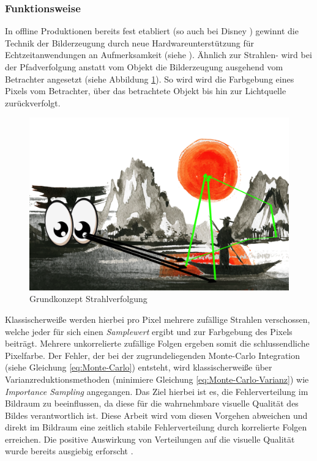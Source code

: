 \subsubsection{Funktionsweise}

In offline Produktionen bereits fest etabliert (so auch bei Disney \cite{DisneyPathTracing}) gewinnt die Technik
der Bilderzeugung durch neue Hardwareunterstützung für Echtzeitanwendungen an Aufmerksamkeit
(siehe \cite{Sch19}).
Ähnlich zur Strahlen- wird bei der Pfadverfolgung anstatt vom Objekt die Bilderzeugung ausgehend 
vom Betrachter angesetzt (siehe Abbildung \ref{pic::GrundkonzeptPathTracing}). So wird wird die 
Farbgebung eines Pixels vom Betrachter, über das betrachtete Objekt bis hin zur Lichtquelle zurückverfolgt.

\begin{figure}[H]
    \begin{tcolorbox}
    \centering
    \includegraphics[width=\linewidth]{content/PathTracer/Bilder/PathTracerGuide.png}
    \end{tcolorbox}
\caption{Grundkonzept Strahlverfolgung}
    \label{pic::GrundkonzeptPathTracing}
\end{figure}

Klassischerweiße werden hierbei pro Pixel mehrere zufällige Strahlen verschossen, welche jeder 
für sich einen \textit{Samplewert} ergibt und zur Farbgebung des Pixels beiträgt. Mehrere
unkorrelierte zufällige Folgen ergeben somit die schlussendliche Pixelfarbe. Der Fehler, der 
bei der zugrundeliegenden Monte-Carlo Integration (siehe Gleichung \ref{eq:Monte-Carlo}) entsteht, 
wird klassischerweiße 
über Varianzreduktionsmethoden (minimiere Gleichung \ref{eq:Monte-Carlo-Varianz}) wie \textit{Importance Sampling}
angegangen.
Das Ziel hierbei ist es, die Fehlerverteilung im Bildraum zu beeinflussen, da diese für die wahrnehmbare 
visuelle Qualität des Bildes verantwortlich ist. Diese Arbeit wird vom diesen Vorgehen abweichen und direkt im 
Bildraum eine zeitlich stabile 
Fehlerverteilung durch korrelierte Folgen erreichen. Die positive Auswirkung von  
Verteilungen auf die visuelle Qualität wurde bereits ausgiebig erforscht \cite{3288}.

